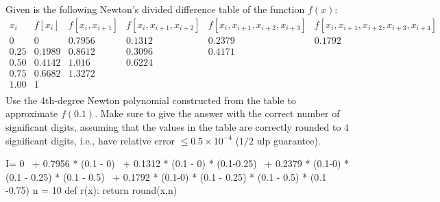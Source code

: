 \documentclass[11pt,letterpaper]{gradescopeexam}
\begin{document}
\ifprintanswers
{}
\fi
\makeheader
\vspace{0.1in}

\begin{questions}
  \begin{question}[10]
    Given is the following Newton's divided difference table of the function \(f(x)\):
    \[
    \begin{array}{c|ccccc}
      x_i & f[x_i] & f[x_i,x_{i+1}] & f[x_i,x_{i+1},x_{i+2}] 
      & f[x_i,x_{i+1},x_{i+2},x_{i+3}] 
      & f[x_i,x_{i+1},x_{i+2},x_{i+3},x_{i+4}] \\[6pt]
      \hline
      0      & 0       & 0.7956 & 0.1312 & 0.2379 & 0.1792 \\
      0.25   & 0.1989  & 0.8612 & 0.3096 & 0.4171 &        \\
      0.50   & 0.4142  & 1.016  & 0.6224 &        &        \\
      0.75   & 0.6682  & 1.3272 &        &        &        \\
      1.00   & 1       &        &        &        &        \\
    \end{array}
    \]
    Use the 4th‑degree Newton polynomial constructed from the table to
    approximate \( f(0.1) \).  Make sure to give the answer with the
    correct number of significant digits, assuming that the values in
    the table are correctly rounded to \(4\) significant digits, i.e.,
    have relative error \(\le 0.5\times 10^{-4}\) (\(1/2\) ulp guarantee).
\begin{pycode}
I= 0 \
   + 0.7956 * (0.1 - 0) \
   + 0.1312 * (0.1 - 0) * (0.1-0.25) \
   + 0.2379 * (0.1-0) * (0.1 - 0.25)  * (0.1 - 0.5) \
   + 0.1792 * (0.1-0) * (0.1 - 0.25)  * (0.1 - 0.5) * (0.1 -0.75)
n = 10
def r(x):
    return round(x,n)
\end{pycode}
 

\end{question}
\end{questions}
\end{document}
